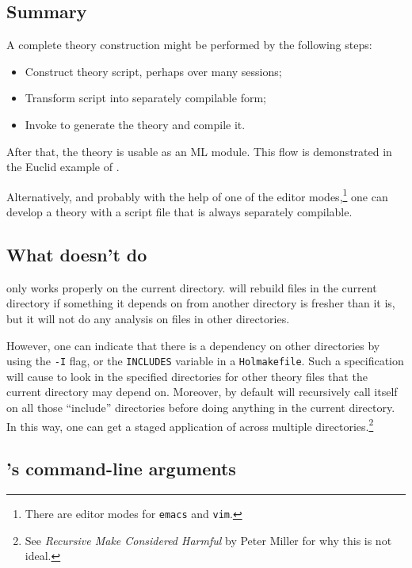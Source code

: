 \subsection{Summary}

A complete theory construction might be performed by the following steps:
\begin{itemize}
\item Construct theory script, perhaps over many sessions;
\item Transform script into separately compilable form;
\item Invoke \holmake{} to generate the theory and compile it.
\end{itemize}
After that, the theory is usable as an ML module.
This flow is demonstrated in the Euclid example of \TUTORIAL.

Alternatively, and probably with the help of one of the editor modes,\footnote{There are editor modes for \texttt{emacs} and \texttt{vim}.} one can develop a theory with a script file that is always separately compilable.

\subsection{What \holmake{} doesn't do}

\holmake{} only works properly on the current directory.
\holmake{} will rebuild files in the current directory if something it depends on from another directory is fresher than it is, but it will not do any analysis on files in other directories.

%
However, one can indicate that there is a dependency on other directories by using the \texttt{-I} flag, or the \texttt{INCLUDES} variable in a \texttt{Holmakefile}.
Such a specification will cause \holmake{} to look in the specified directories for other theory files that the current directory may depend on.
Moreover, by default \holmake{} will recursively call itself on all those ``include'' directories before doing anything in the current directory.
In this way, one can get a staged application of \holmake{} across multiple directories.\footnote{See \emph{Recursive Make Considered
    Harmful} by Peter Miller for why this is not ideal.}

\subsection{\holmake{}'s command-line arguments}

